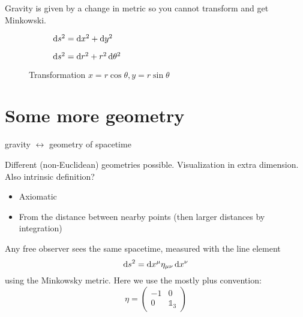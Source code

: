 Gravity is given by a change in metric so you cannot transform and get Minkowski.



\begin{figure}
\centering
\begin{subfigure}{.5\textwidth}
  \caption{$\operatorname{d \!}{s}^2 = \operatorname{d \!}{x}^2 + \operatorname{d \!}{y}^2$}
  \centering
\end{subfigure}%
\begin{subfigure}{.5\textwidth}
  \caption{$\operatorname{d \!}{s}^2 = \operatorname{d \!}{r}^2 + r^2\operatorname{d \!}{\theta}^2$}
  \centering
\end{subfigure}
\caption{Transformation $x= r\cos\theta, y= r\sin\theta$}
\end{figure}


\section{Some more geometry}
gravity $\leftrightarrow$ geometry of spacetime

Different (non-Euclidean) geometries possible. Visualization in extra dimension. Also intrinsic definition? 
\begin{itemize}
\item Axiomatic
\item From the distance between nearby points (then larger distances by integration)
\end{itemize}

Any free observer sees the same spacetime, measured with the line element
\[ \operatorname{d \!}{s}^2 = \operatorname{d \!}{x}^\mu \eta_{\mu\nu}\operatorname{d \!}{x}^\nu \]
using the Minkowsky metric. Here we use the mostly plus convention:
\[ \eta = \begin{pmatrix}
-1 & 0 \\
0 & \mathbb{1}_3
\end{pmatrix} \]


